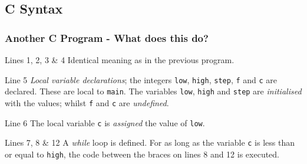 \documentclass[smaller,table]{beamer} %
\begin{document}
\subsection{C Syntax}
\ifhandout
\begin{frame}[fragile]
\frametitle {Another C Program - What does this do?}

\end{frame}

\begin{frame}
\begin{block}{Lines 1, 2, 3 \& 4}
Identical meaning as in the previous program.
\end{block}

\begin{block}{Line 5}
\emph{Local variable declarations}; the integers {\tt low}, {\tt high},
{\tt step}, {\tt f} and {\tt c} are declared. These are local to {\tt main}.
The variables {\tt low}, {\tt high} and {\tt step} are \emph{initialised}
with the values; whilst {\tt f} and {\tt c} are \emph{undefined}.
\end{block}
 
\begin{block}{Line 6}
The local variable {\tt c} is \emph{assigned} the value of
{\tt low}.
\end{block}

\begin{block}{Lines 7, 8 \& 12}
A \emph{while} loop is defined. For as long as the variable {\tt c} is less than or equal to {\tt high}, the code between the braces on lines 8 and 12 is executed.
\end{block}

\end{frame}
\end{document}

